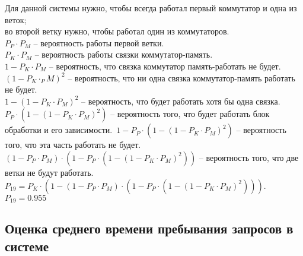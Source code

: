 \documentclass[12pt, a4paper] {ncc}
\begin{document}
		Для данной системы нужно, чтобы всегда работал первый коммутатор и одна из веток;\\
	    во второй ветку нужно, чтобы работал один из коммутаторов.\\
	    $P_P \cdot P_M$ -- вероятность работы первой ветки.\\
	    $P_K \cdot P_M$ -- вероятность работы связки коммутатор-память.\\
	    $1 - P_K \cdot P_M$ -- вероятность, что связка коммутатор память-работать не будет.\\
	    $(1 - P_K \cdot _PM)^2$ -- вероятность, что ни одна связка коммутатор-память работать не будет.\\
	    $1 - (1 - P_K \cdot P_M)^2$ -- вероятность, что будет работать хотя бы одна связка.\\
	    $P_P \cdot (1 - (1 - P_K \cdot P_M)^2)$ -- вероятность того, что будет работать блок обработки и его зависимости.\
	    $1 - P_P \cdot (1 - (1 - P_K \cdot P_M)^2)$ -- вероятность того, что эта часть работать не будет.\\
	    $(1 - P_P \cdot P_M) \cdot (1 - P_P \cdot (1 - (1 - P_K \cdot P_M)^2))$ -- вероятность того, что две ветки не будут работать.\\
	    $P_{19} = P_K \cdot (1 - (1 - P_P \cdot P_M) \cdot (1 - P_P \cdot (1 - (1 - P_K \cdot P_M)^2)))$.\\
		$P_{19} = 0.955$

        \subsection{Оценка среднего времени пребывания запросов в системе}
            \begin{center}
			\end{center}
\end{document}
